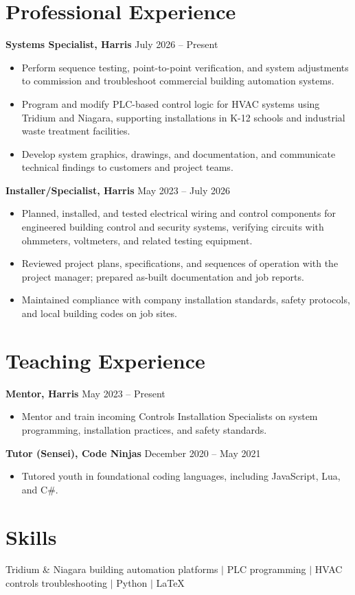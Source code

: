 \documentclass[10.5pt]{article}
\newcommand{\jobheader}[2]{%
  \noindent\textbf{#1} \hfill #2\par
}
\begin{document}
\section*{Professional Experience}
\jobheader{Systems Specialist, Harris}{July 2026 -- Present}
\begin{itemize}
  \item Perform sequence testing, point-to-point verification, and system adjustments to commission and troubleshoot commercial building automation systems.
  \item Program and modify PLC-based control logic for HVAC systems using Tridium and Niagara, supporting installations in K-12 schools and industrial waste treatment facilities.
  \item Develop system graphics, drawings, and documentation, and communicate technical findings to customers and project teams.
\end{itemize}
\jobheader{Installer/Specialist, Harris}{May 2023 -- July 2026}
\begin{itemize}
  \item Planned, installed, and tested electrical wiring and control components for engineered building control and security systems, verifying circuits with ohmmeters, voltmeters, and related testing equipment.
  \item Reviewed project plans, specifications, and sequences of operation with the project manager; prepared as-built documentation and job reports.
  \item Maintained compliance with company installation standards, safety protocols, and local building codes on job sites.
\end{itemize}

\section*{Teaching Experience}
\jobheader{Mentor, Harris}{May 2023 -- Present}
\begin{itemize}
  \item Mentor and train incoming Controls Installation Specialists on system programming, installation practices, and safety standards.
\end{itemize}
\jobheader{Tutor (Sensei), Code Ninjas}{December 2020 -- May 2021}
\begin{itemize}
  \item Tutored youth in foundational coding languages, including JavaScript, Lua, and C\#.
\end{itemize}

\section*{Skills}
Tridium \& Niagara building automation platforms $\vert$ PLC programming $\vert$ HVAC controls troubleshooting $\vert$ Python $\vert$ LaTeX
\end{document}
